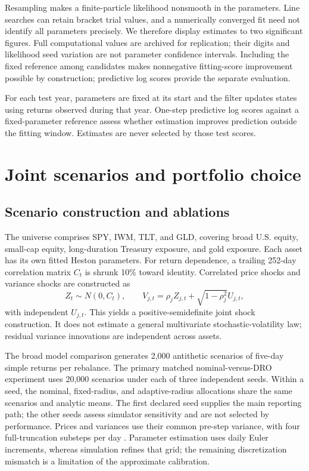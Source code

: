 Resampling makes a finite-particle likelihood nonsmooth in the parameters. Line searches can retain bracket trial values, and a numerically converged fit need not identify all parameters precisely. We therefore display estimates to two significant figures. Full computational values are archived for replication; their digits and likelihood seed variation are not parameter confidence intervals. Including the fixed reference among candidates makes nonnegative fitting-score improvement possible by construction; predictive log scores provide the separate evaluation.

For each test year, parameters are fixed at its start and the filter updates states using returns observed during that year. One-step predictive log scores against a fixed-parameter reference assess whether estimation improves prediction outside the fitting window. Estimates are never selected by those test scores.

\section{Joint scenarios and portfolio choice}
\subsection{Scenario construction and ablations}
The universe comprises SPY, IWM, TLT, and GLD, covering broad U.S. equity, small-cap equity, long-duration Treasury exposure, and gold exposure. Each asset has its own fitted Heston parameters. For return dependence, a trailing 252-day correlation matrix $C_t$ is shrunk 10\% toward identity. Correlated price shocks and variance shocks are constructed as
\begin{equation}
Z_t\sim N(0,C_t),\qquad
V_{j,t}=\rho_j Z_{j,t}+\sqrt{1-\rho_j^2}U_{j,t},
\end{equation}
with independent $U_{j,t}$. This yields a positive-semidefinite joint shock construction. It does not estimate a general multivariate stochastic-volatility law; residual variance innovations are independent across assets.

The broad model comparison generates 2,000 antithetic scenarios of five-day simple returns per rebalance. The primary matched nominal-versus-DRO experiment uses 20,000 scenarios under each of three independent seeds. Within a seed, the nominal, fixed-radius, and adaptive-radius allocations share the same scenarios and analytic means. The first declared seed supplies the main reporting path; the other seeds assess simulator sensitivity and are not selected by performance. Prices and variances use their common pre-step variance, with four full-truncation substeps per day \cite{lord}. Parameter estimation uses daily Euler increments, whereas simulation refines that grid; the remaining discretization mismatch is a limitation of the approximate calibration.

